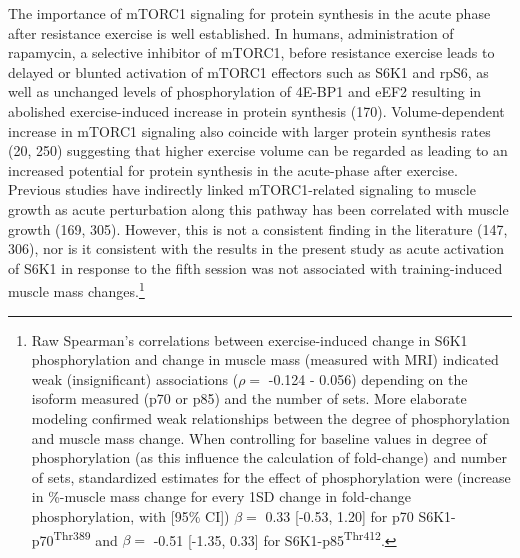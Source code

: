 \documentclass[twoside,10pt]{gihclass} %
\begin{document}
The importance of mTORC1 signaling for protein synthesis in the acute phase after resistance exercise is well established.
In humans, administration of rapamycin, a selective inhibitor of mTORC1, before resistance exercise leads to delayed or blunted activation of mTORC1 effectors such as
S6K1 and rpS6, as well as unchanged levels of phosphorylation of 4E-BP1 and eEF2 resulting in abolished exercise-induced increase in protein synthesis
(170).
Volume-dependent increase in mTORC1 signaling also coincide with larger protein synthesis rates
(20, 250)
suggesting that higher exercise volume can be regarded as leading to an increased potential for protein synthesis in the acute-phase after exercise.
Previous studies have indirectly linked mTORC1-related signaling to muscle growth as acute perturbation along this pathway has been correlated with muscle growth
(169, 305).
However, this is not a consistent finding in the literature
(147, 306),
nor is it consistent with the results in the present study as acute activation of S6K1 in response to the fifth session was not associated with training-induced muscle mass changes.\footnote{Raw Spearman's correlations between exercise-induced change in S6K1 phosphorylation and change in muscle mass (measured with MRI) indicated weak (insignificant) associations (\(\rho=\) -0.124 - 0.056) depending on the isoform measured (p70 or p85) and the number of sets. More elaborate modeling confirmed weak relationships between the degree of phosphorylation and muscle mass change. When controlling for baseline values in degree of phosphorylation (as this influence the calculation of fold-change) and number of sets, standardized estimates for the effect of phosphorylation were (increase in \%-muscle mass change for every 1SD change in fold-change phosphorylation, with {[}95\% CI{]}) \(\beta=\) 0.33 {[}-0.53, 1.20{]} for p70 S6K1-p70\textsuperscript{Thr389} and \(\beta=\) -0.51 {[}-1.35, 0.33{]} for S6K1-p85\textsuperscript{Thr412}.}
\end{document}
